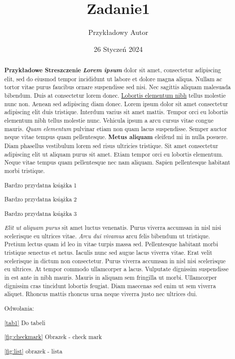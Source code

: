 \documentclass[12pt]{article}
\title{Zadanie1}
\author{Przykładowy Autor}
\date{26 Styczeń 2024}
\begin{document}
\maketitle
\tableofcontents
\listoftables
\listoffigures

\newpage

\begin{abstract}
\textbf{Przykładowe Streszczenie}
\textit{\textbf{Lorem ipsum}} dolor sit amet, consectetur adipiscing elit, sed do eiusmod tempor incididunt ut labore et dolore magna aliqua. Nullam ac tortor vitae purus faucibus ornare suspendisse sed nisi. Nec sagittis aliquam malesuada bibendum. Duis at consectetur lorem donec. \underline{Lobortis elementum nibh} tellus molestie nunc non. Aenean sed adipiscing diam donec. Lorem ipsum dolor sit amet consectetur adipiscing elit duis tristique. Interdum varius sit amet mattis. Tempor orci eu lobortis elementum nibh tellus molestie nunc. Vehicula ipsum a arcu cursus vitae congue mauris. \textit{Quam elementum} pulvinar etiam non quam lacus suspendisse. Semper auctor neque vitae tempus quam pellentesque. \textbf{Metus aliquam} eleifend mi in nulla posuere. Diam phasellus vestibulum lorem sed risus ultricies tristique. Sit amet consectetur adipiscing elit ut aliquam purus sit amet. Etiam tempor orci eu lobortis elementum. Neque vitae tempus quam pellentesque nec nam aliquam. Sapien pellentesque habitant morbi tristique.
\newline

\cite{book1} Bardzo przydatna książka 1

\cite{book2} Bardzo przydatna książka 2

\cite{book3} Bardzo przydatna książka 3

\hfill \break

\textit{Elit ut aliquam purus} sit amet luctus venenatis. Purus viverra accumsan in nisl nisi scelerisque eu ultrices vitae. \textit{Arcu dui vivamus} arcu felis bibendum ut tristique. Pretium lectus quam id leo in vitae turpis massa sed. Pellentesque habitant morbi tristique senectus et netus. Iaculis nunc sed augue lacus viverra vitae. Erat velit scelerisque in dictum non consectetur. Purus viverra accumsan in nisl nisi scelerisque eu ultrices. At tempor commodo ullamcorper a lacus. Vulputate dignissim suspendisse in est ante in nibh mauris. Mauris in aliquam sem fringilla ut morbi. Ullamcorper dignissim cras tincidunt lobortis feugiat. Diam maecenas sed enim ut sem viverra aliquet. Rhoncus mattis rhoncus urna neque viverra justo nec ultrices dui.

Odwołania:

\ref{tab1} Do tabeli

\ref{fig:checkmark} Obrazek - check mark

\ref{fig:list} obrazek - lista

\end{abstract}
\end{document}
